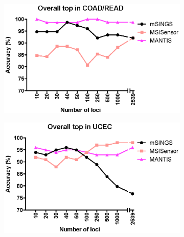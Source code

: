 \begin{figure}[p]
\begin{subfigure}{0.33\textwidth}
		\caption{}\label{fig:msilandscape:tool_performance_stad_loci_stad}
	\end{subfigure}
	\par
	\begin{subfigure}{0.33\textwidth}
		\includegraphics[width=\linewidth,keepaspectratio]{images/msilandscape/tool_performance_top_loci_coadread}
		\caption{}\label{fig:msilandscape:tool_performance_top_loci_coadread}
	\end{subfigure}%
	\hfill%
	\begin{subfigure}{0.33\textwidth}
		\includegraphics[width=\linewidth,keepaspectratio]{images/msilandscape/tool_performance_top_loci_ucec}
		\caption{}\label{fig:msilandscape:tool_performance_top_loci_ucec}
	\end{subfigure}%
	\hfill%
	\begin{subfigure}{0.33\textwidth}

\end{subfigure}
\end{figure}

